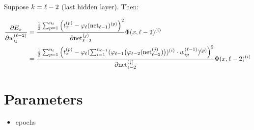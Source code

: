 
Suppose $k = {\ell} - 2$ (last hidden layer). Then:

\begin{align}
    \frac{\partial E_x}{\partial w_{ij}^{({\ell}-2)}} &= \frac{\frac{1}{2} \sum_{p=1}^{n_{\ell}} \left ( t_x^{(p)} -\varphi_{{\ell}}(\mathrm{net}_{{\ell}-1})^{(p)} \right )^2}{\partial \mathrm{net}_{{\ell}-2}^{(j)}} \Phi(x, {\ell}-2)^{(i)}\\
    &= \frac{\frac{1}{2} \sum_{p=1}^{n_{\ell}} \left ( t_x^{(p)} -\varphi_{{\ell}}(\sum_{i=1}^{n_{{\ell}-1}} (
        \varphi_{{\ell}-1} \big (\varphi_{{\ell}-2}(\mathrm{net}_{{\ell}-2}^{(j)}) \big)
    )^{(i)} \cdot w_{ip}^{({\ell}-1)})^{(p)} \right )^2}{\partial \mathrm{net}_{{\ell}-2}^{(j)}} \Phi(x, {\ell}-2)^{(i)}\\
\end{align}

\section{Parameters}
\begin{itemize}
    \item \Glspl{epoch}
\end{itemize}